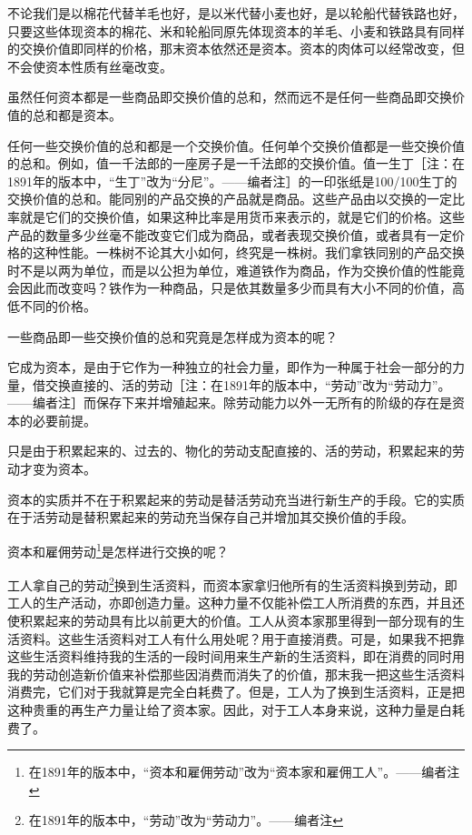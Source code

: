 \documentclass[a4paper,twoside,12pt,AutoFakeBold]{ctexart}
\begin{document}
不论我们是以棉花代替羊毛也好，是以米代替小麦也好，是以轮船代替铁路也好，只要这些体现资本的棉花、米和轮船同原先体现资本的羊毛、小麦和铁路具有同样的交换价值即同样的价格，那末资本依然还是资本。资本的肉体可以经常改变，但不会使资本性质有丝毫改变。

虽然任何资本都是一些商品即交换价值的总和，然而远不是任何一些商品即交换价值的总和都是资本。

任何一些交换价值的总和都是一个交换价值。任何单个交换价值都是一些交换价值的总和。例如，值一千法郎的一座房子是一千法郎的交换价值。值一生丁［注：在1891年的版本中，“生丁”改为“分尼”。——编者注］的一印张纸是100/100生丁的交换价值的总和。能同别的产品交换的产品就是商品。这些产品由以交换的一定比率就是它们的交换价值，如果这种比率是用货币来表示的，就是它们的价格。这些产品的数量多少丝毫不能改变它们成为商品，或者表现交换价值，或者具有一定价格的这种性能。一株树不论其大小如何，终究是一株树。我们拿铁同别的产品交换时不是以两为单位，而是以公担为单位，难道铁作为商品，作为交换价值的性能竟会因此而改变吗？铁作为一种商品，只是依其数量多少而具有大小不同的价值，高低不同的价格。

一些商品即一些交换价值的总和究竟是怎样成为资本的呢？

它成为资本，是由于它作为一种独立的社会力量，即作为一种属于社会一部分的力量，借交换直接的、活的劳动［注：在1891年的版本中，“劳动”改为“劳动力”。——编者注］而保存下来并增殖起来。除劳动能力以外一无所有的阶级的存在是资本的必要前提。

只是由于积累起来的、过去的、物化的劳动支配直接的、活的劳动，积累起来的劳动才变为资本。

资本的实质并不在于积累起来的劳动是替活劳动充当进行新生产的手段。它的实质在于活劳动是替积累起来的劳动充当保存自己并增加其交换价值的手段。

资本和雇佣劳动\footnote{在1891年的版本中，“资本和雇佣劳动”改为“资本家和雇佣工人”。——编者注}是怎样进行交换的呢？

工人拿自己的劳动\footnote{在1891年的版本中，“劳动”改为“劳动力”。——编者注}换到生活资料，而资本家拿归他所有的生活资料换到劳动，即工人的生产活动，亦即创造力量。这种力量不仅能补偿工人所消费的东西，并且还使积累起来的劳动具有比以前更大的价值。工人从资本家那里得到一部分现有的生活资料。这些生活资料对工人有什么用处呢？用于直接消费。可是，如果我不把靠这些生活资料维持我的生活的一段时间用来生产新的生活资料，即在消费的同时用我的劳动创造新价值来补偿那些因消费而消失了的价值，那末我一把这些生活资料消费完，它们对于我就算是完全白耗费了。但是，工人为了换到生活资料，正是把这种贵重的再生产力量让给了资本家。因此，对于工人本身来说，这种力量是白耗费了。
\end{document}
